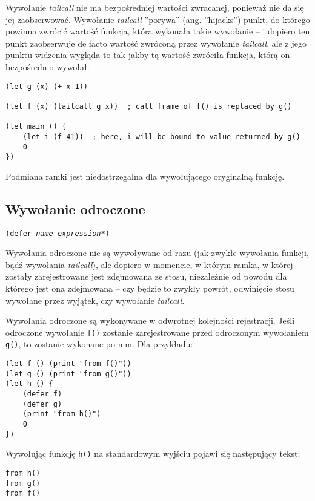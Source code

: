 \documentclass[11pt,oneside,a4paper,titlepage,onecolumn]{article}
\begin{document}
Wywołanie \emph{tailcall} nie ma bezpośredniej wartości zwracanej, ponieważ nie da się jej zaobserwować.
Wywołanie \emph{tailcall} ''porywa'' (ang. ''hijacks'') punkt, do którego powinna zwrócić wartość funkcja,
która wykonała takie wywołanie -- i dopiero ten punkt zaobserwuje de facto wartość zwróconą przez wywołanie
\emph{tailcall}, ale z jego punktu widzenia wygląda to tak jakby tą wartość zwróciła funkcja, którą on
bezpośrednio wywołał.

\begin{lstlisting}
(let g (x) (+ x 1))

(let f (x) (tailcall g x))  ; call frame of f() is replaced by g()

(let main () {
    (let i (f 41))  ; here, i will be bound to value returned by g()
    0
})
\end{lstlisting}

Podmiana ramki jest niedostrzegalna dla wywołującego oryginalną funkcję.

\subsection{Wywołanie odroczone}

\texttt{(defer \emph{name} \emph{expression}*)}
\newline

Wywołania odroczone nie są wywoływane od razu (jak zwykłe wywołania funkcji, bądź wywołania \emph{tailcall}),
ale dopiero w momencie, w którym ramka, w której zostały zarejestrowane jest zdejmowana ze stosu, niezależnie
od powodu dla którego jest ona zdejmowana -- czy będzie to zwykły powrót, odwinięcie stosu wywołane przez
wyjątek, czy wywołanie \emph{tailcall}.

Wywołania odroczone są wykonywane w odwrotnej kolejności rejestracji. Jeśli odroczone wywołanie \texttt{f()}
zostanie zarejestrowane przed odroczonym wywołaniem \texttt{g()}, to zostanie wykonane po nim. Dla przykładu:

\begin{lstlisting}
(let f () (print "from f()"))
(let g () (print "from g()"))
(let h () {
    (defer f)
    (defer g)
    (print "from h()")
    0
})
\end{lstlisting}

Wywołując funkcję \texttt{h()} na standardowym wyjściu pojawi się następujący tekst:

\begin{verbatim}
from h()
from g()
from f()
\end{verbatim}
\end{document}
